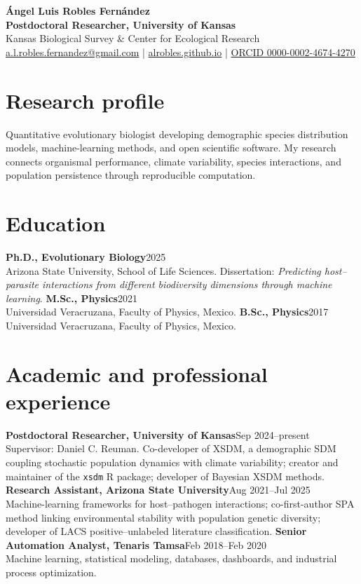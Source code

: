 \documentclass[10pt,letterpaper]{article}
\newcommand{\cvitem}[2]{\textbf{#1}\hfill #2\\}
\begin{document}
\begin{center}
{\LARGE\bfseries Ángel Luis Robles Fernández}\\[-0.1em]
\textbf{Postdoctoral Researcher, University of Kansas}\\
Kansas Biological Survey \& Center for Ecological Research\\[-0.1em]
\href{mailto:a.l.robles.fernandez@gmail.com}{a.l.robles.fernandez@gmail.com}
\enspace|\enspace
\href{https://alrobles.github.io}{alrobles.github.io}
\enspace|\enspace
\href{https://orcid.org/0000-0002-4674-4270}{ORCID 0000-0002-4674-4270}
\end{center}

\section*{Research profile}
Quantitative evolutionary biologist developing demographic species distribution models, machine-learning methods, and open scientific software. My research connects organismal performance, climate variability, species interactions, and population persistence through reproducible computation.

\section*{Education}
\cvitem{Ph.D., Evolutionary Biology}{2025}
Arizona State University, School of Life Sciences. Dissertation: \emph{Predicting host--parasite interactions from different biodiversity dimensions through machine learning}.
\cvitem{M.Sc., Physics}{2021}
Universidad Veracruzana, Faculty of Physics, Mexico.
\cvitem{B.Sc., Physics}{2017}
Universidad Veracruzana, Faculty of Physics, Mexico.

\section*{Academic and professional experience}
\cvitem{Postdoctoral Researcher, University of Kansas}{Sep 2024--present}
Supervisor: Daniel C. Reuman. Co-developer of XSDM, a demographic SDM coupling stochastic population dynamics with climate variability; creator and maintainer of the \texttt{xsdm} R package; developer of Bayesian XSDM methods.
\cvitem{Research Assistant, Arizona State University}{Aug 2021--Jul 2025}
Machine-learning frameworks for host--pathogen interactions; co-first-author SPA method linking environmental stability with population genetic diversity; developer of LACS positive--unlabeled literature classification.
\cvitem{Senior Automation Analyst, Tenaris Tamsa}{Feb 2018--Feb 2020}
Machine learning, statistical modeling, databases, dashboards, and industrial process optimization.
\end{document}
